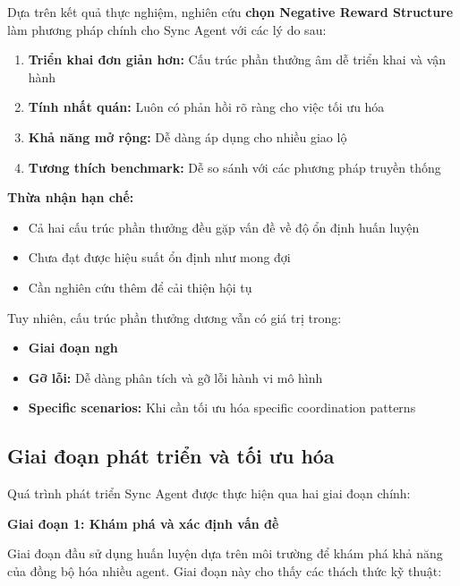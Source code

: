 Dựa trên kết quả thực nghiệm, nghiên cứu \textbf{chọn Negative Reward Structure}
làm phương pháp chính cho Sync Agent với các lý do sau:

\begin{enumerate}
    \item \textbf{Triển khai đơn giản hơn:} Cấu trúc phần thưởng âm dễ triển khai
        và vận hành
    \item \textbf{Tính nhất quán:} Luôn có phản hồi rõ ràng cho việc tối ưu hóa

    \item \textbf{Khả năng mở rộng:} Dễ dàng áp dụng cho nhiều giao lộ

    \item \textbf{Tương thích benchmark:} Dễ so sánh với các phương pháp
        truyền thống
\end{enumerate}

\textbf{Thừa nhận hạn chế:}
\begin{itemize}
    \item Cả hai cấu trúc phần thưởng đều gặp vấn đề về độ ổn định huấn luyện

    \item Chưa đạt được hiệu suất ổn định như mong đợi
    \item Cần nghiên cứu thêm để cải thiện hội tụ
\end{itemize}

Tuy nhiên, cấu trúc phần thưởng dương vẫn có giá trị trong:
\begin{itemize}
    \item \textbf{Giai đoạn ngh}

    \item \textbf{Gỡ lỗi:} Dễ dàng phân tích và gỡ lỗi hành vi mô hình

    \item \textbf{Specific scenarios:} Khi cần tối ưu hóa specific coordination patterns
\end{itemize}

\subsection{Giai đoạn phát triển và tối ưu hóa}

Quá trình phát triển Sync Agent được thực hiện qua hai giai đoạn chính:

\textbf{Giai đoạn 1: Khám phá và xác định vấn đề}

Giai đoạn đầu sử dụng huấn luyện dựa trên môi trường để khám phá khả năng của
đồng bộ hóa nhiều agent. Giai đoạn này cho thấy các thách thức kỹ thuật:


